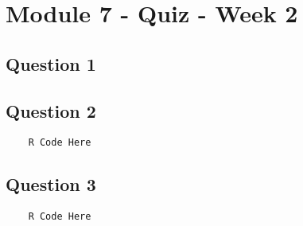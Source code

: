 \documentclass[french]{article}
\begin{document}
\section*{Module 7 - Quiz - Week 2}
\subsection*{Question 1}

\newpage
\subsection*{Question 2}

\begin{framed}
	\begin{verbatim}
	R Code Here
	\end{verbatim}
\end{framed}
\newpage
\subsection*{Question 3}
\begin{framed}
	\begin{verbatim}
	R Code Here
	\end{verbatim}
\end{framed}
\end{document}

